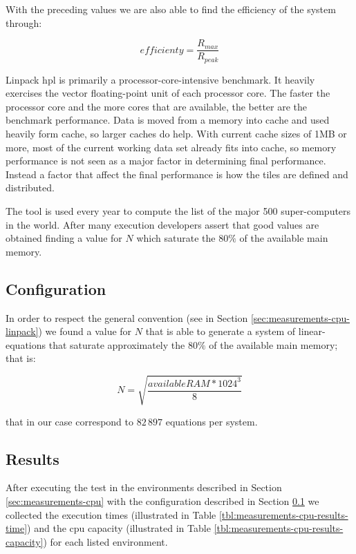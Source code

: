 With the preceding values we are also able to find the efficiency of the system through:

\begin{center}
	\begin{equation}
		efficienty = \frac{R_{max}}{R_{peak}}
	\end{equation}
\end{center}

Linpack \ac{hpl} is primarily a processor-core-intensive benchmark. It heavily exercises the vector
floating-point unit of each processor core. The faster the processor core and the more cores that are
available, the better are the benchmark performance. Data is moved from a memory into cache and used
heavily form cache, so larger caches do help. With current cache sizes of 1MB or more, most of
the current working data set already fits into cache, so memory performance is not seen as a major
factor in determining final performance. Instead a factor that affect the final performance is how
the tiles are defined and distributed.

The tool is used every year to compute the list of the major 500 super-computers in the world. After many
execution developers assert that good values are obtained finding a value for $N$ which saturate the
$80\%$ of the available main memory.

\subsection{Configuration}
\label{sec:measurements-cpu-configuration}
In order to respect the general convention (see in Section \ref{sec:measurements-cpu-linpack}) we found
a value for $N$ that is able to generate a system of linear-equations that saturate approximately the
$80\%$ of the available main memory; that is:

\begin{center}
	\begin{equation}
		N = \sqrt{\frac{available RAM * 1024^3}{8}}
	\end{equation}
\end{center}

that in our case correspond to $82\,897$ equations per system.

\subsection{Results}
\label{sec:measurements-cpu-results}
After executing the test in the environments described in Section \ref{sec:measurements-cpu} with the
configuration described in Section \ref{sec:measurements-cpu-configuration} we collected the execution
times (illustrated in Table \ref{tbl:measurements-cpu-results-time}) and the \acs{cpu}
capacity (illustrated in Table \ref{tbl:measurements-cpu-results-capacity}) for each listed
environment.

